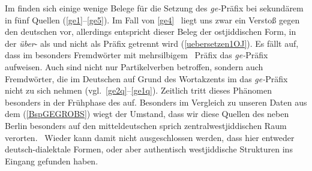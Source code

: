 Im  finden sich einige wenige Belege für die Setzung des \textit{ge-}Präfix bei sekundärem  in fünf Quellen (\ref{ge1}–\ref{ge5}). Im Fall von \ref{ge4} \,%
liegt uns zwar ein Verstoß gegen den deutschen  vor, allerdings entspricht dieser Beleg der ostjiddischen Form, in der \textit{über}- als  und nicht als Präfix getrennt wird (\ref{uebersetzen1OJ}). Es fällt auf, dass im \hai{{\LiJi}} besonders Fremdwörter mit mehrsilbigem \,%
Präfix das \textit{ge-}Präfix aufweisen.  Auch sind nicht nur Partikelverben betroffen, sondern auch Fremdwörter, die im Deutschen auf Grund des Wortakzents im  das \textit{ge-}Präfix nicht zu sich nehmen (vgl.\, \ref{ge2q}–\ref{ge1q}).  Zeitlich tritt dieses Phänomen besonders in der Frühphase des \hai{{\LiJi}} auf. Besonders im Vergleich zu unseren Daten aus dem \hai{{\ZWJ}} (\ref{BspGEGROBS}) wiegt der Umstand, dass wir diese Quellen des  neben Berlin besonders auf den mitteldeutschen sprich zentralwestjiddischen Raum verorten. \,%
Wieder kann damit nicht ausgeschlossen werden, dass hier entweder deutsch-dialektale Formen, oder aber authentisch westjiddische Strukturen ins  Eingang gefunden haben. 
	



